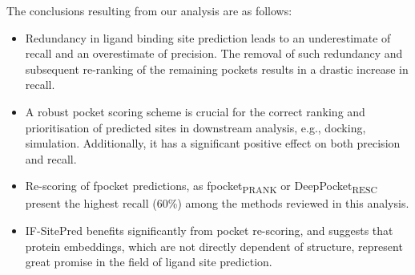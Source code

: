 The conclusions resulting from our analysis are as follows:

\begin{itemize}

\item Redundancy in ligand binding site prediction leads to an underestimate of recall and an overestimate of precision. The removal of such redundancy and subsequent re-ranking of the remaining pockets results in a drastic increase in recall.

\item A robust pocket scoring scheme is crucial for the correct ranking and prioritisation of predicted sites in downstream analysis, e.g., docking, simulation. Additionally, it has a significant positive effect on both precision and recall.

\item Re-scoring of fpocket predictions, as fpocket\textsubscript{PRANK} or DeepPocket\textsubscript{RESC} present the highest recall (60\%) among the methods reviewed in this analysis.

\item IF-SitePred benefits significantly from pocket re-scoring, and suggests that protein embeddings, which are not directly dependent of structure, represent great promise in the field of ligand site prediction.

\end{itemize}

